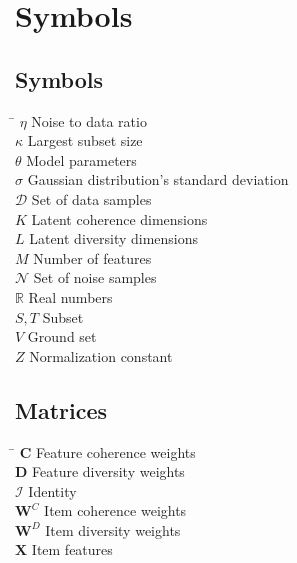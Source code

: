 \chapter*{Symbols}
\label{sec:symbols}


\section*{Symbols}

\begin{tabbing}
 \hspace*{1.6cm} \= \kill
 $\eta$ \> Noise to data ratio \\ [0.5ex]
 $\kappa$ \> Largest subset size \\ [0.5ex]
 $\theta$ \> Model parameters \\ [0.5ex]
 $\sigma$ \> Gaussian distribution's standard deviation \\ [0.5ex]
 $\mathcal{D}$ \> Set of data samples \\ [0.5ex]
 $K$ \> Latent coherence dimensions \\ [0.5ex]
 $L$ \> Latent diversity dimensions \\ [0.5ex]
 $M$ \> Number of features \\ [0.5ex]
 $\mathcal{N}$ \> Set of noise samples \\ [0.5ex]
 $\mathbb{R}$ \> Real numbers \\ [0.5ex]
 $S,T$ \> Subset \\ [0.5ex]
 $V$ \> Ground set \\ [0.5ex]
 $Z$ \> Normalization constant \\ [0.5ex]
\end{tabbing}

\section*{Matrices}

\begin{tabbing}
  \hspace*{1.6cm} \= \kill
  $\mathbf{C}$ \> Feature coherence weights \\ [0.5ex]
  $\mathbf{D}$ \> Feature diversity weights \\ [0.5ex]
  $\mathcal{I}$ \> Identity \\ [0.5ex]
  $\mathbf{W}^{C}$ \> Item coherence weights \\ [0.5ex]
  $\mathbf{W}^{D}$ \> Item diversity weights \\ [0.5ex]
  $\mathbf{X}$ \> Item features \\ [0.5ex]
\end{tabbing}

